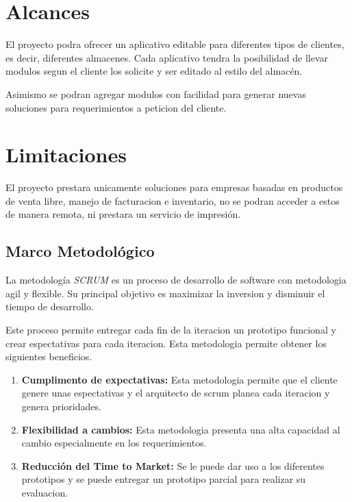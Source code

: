 \section{Alcances}

El proyecto podra ofrecer un aplicativo editable para diferentes tipos de clientes, es decir, diferentes almacenes. Cada aplicativo tendra la posibilidad de llevar modulos segun el cliente los solicite y ser editado al estilo del almacén.

Asimismo se podran agregar modulos con facilidad para generar nuevas soluciones para requerimientos a peticion del cliente.



\section{Limitaciones}

El proyecto prestara unicamente soluciones para empresas basadas en productos de venta libre, manejo de facturacion e inventario, no se podran acceder a estos de manera remota, ni prestara un servicio de impresión.

\subsection{Marco Metodológico}

La metodología  \textit{SCRUM}  es un proceso de desarrollo de software con metodologia agil y flexible. Su principal objetivo es maximizar la inversion y disminuir el tiempo de desarrollo. 

Este proceso permite entregar cada fin de la iteracion un prototipo funcional y crear espectativas para cada iteracion. Esta metodologia permite obtener los siguientes beneficios. 

\begin{enumerate}

    \item \textbf{Cumplimento de expectativas:} Esta metodologia permite que el cliente genere unas espectativas y el arquitecto de scrum planea cada iteracion y genera prioridades.
    
    \item \textbf{Flexibilidad a cambios:} Esta metodologia presenta una alta capacidad al cambio especialmente en los requerimientos.
    
    \item \textbf{Reducción del Time to Market:} Se le puede dar uso a los diferentes prototipos y se puede entregar un prototipo parcial para realizar su evaluacion.
    
    
\end{enumerate}

